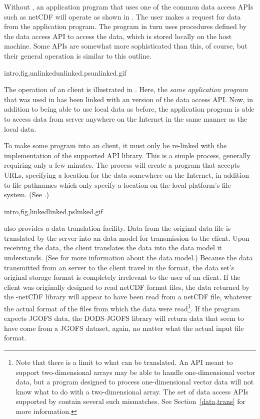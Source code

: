 Without \opendap, an application program that uses one of the common data
access APIs such as netCDF will operate as shown in .  
The user
makes a request for data from the application program.  The program in turn
uses procedures defined by the data access API to access the data,
which is stored locally on the host machine.  Some APIs are somewhat more
sophisticated than this, of course, but their general operation is
similar to this outline.

{intro,fig,unlinked}{unlinked.ps}{unlinked.gif}{}

The operation of an \opendap client is illustrated in .  
Here, the
\emph{same application program} that was used in  
has been linked
with an \opendap version of the data access API.  Now, in addition to being
able to use local data as before, the application program is able to access
data from \opendap server anywhere on the Internet in the same manner as the
local data.

To make some program into an \opendap client, it must only be re-linked with
the \opendap implementation of the supported API library. This is a simple
process, generally requiring only a few minutes. The process will
create a program that accepts URLs, specifying a location for the data
somewhere on the Internet, in addition to file pathnames which only
specify a location on the local platform's file system. (See
.) 

{intro,fig,linked}{linked.ps}{linked.gif}{}

\opendap also provides a data translation facility. Data from the original
data file is translated by the \opendap server into an \opendap data model for
transmission to the client. Upon receiving the data, the client
translates the data into the data model it understands. (See
 for more information about the \opendap data model.)
Because the data transmitted from an \opendap server to the client travel
in the \opendap format, the data set's original storage format is completely
irrelevant to the user of an \opendap client. If the client was originally
designed to read netCDF format files, the data returned by the
\opendap-netCDF library will appear to have been read from a netCDF file,
whatever the actual format of the files from which the data were
read\footnote{Note that there is a limit to what can be translated. An
API meant to support two-dimensional arrays may be able to handle
one-dimensional vector data, but a program designed to process
one-dimensional vector data will not know what to do with a
two-dimensional array. The set of data access APIs supported by \opendap
contain several such mismatches. See
Section~\ref{data,trans} for more information.}. If the
program expects JGOFS data, the DODS-JGOFS library will return data
that seem to have come from a JGOFS dataset, again, no matter what the
actual input file format.

